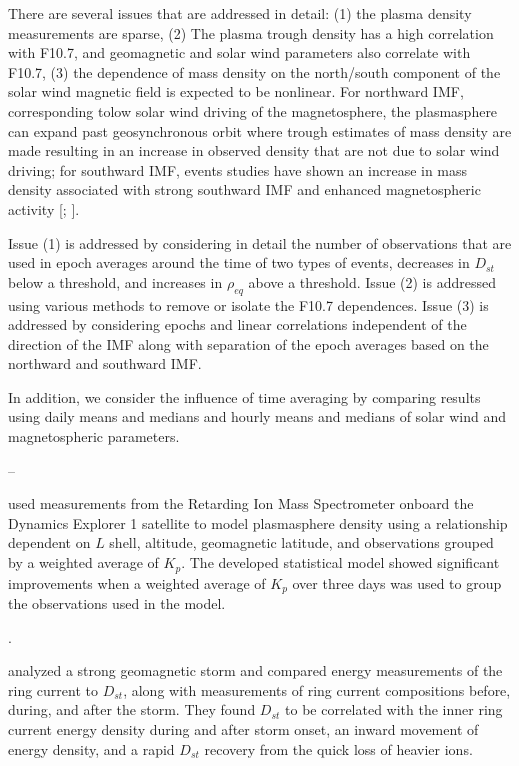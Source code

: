 \documentclass[10pt,twocolumn]{article}
\def\note#1\par{\textcolor{blue}{\textbf{#1}}\\}
\begin{document}
There are several issues that are addressed in detail: (1) the plasma density measurements are sparse, (2) The plasma trough density has a high correlation with F10.7, and geomagnetic and solar wind parameters also correlate with F10.7, (3) the dependence of mass density on the north/south component of the solar wind magnetic field is expected to be nonlinear. For northward IMF, corresponding tolow solar wind driving of the magnetosphere, the plasmasphere can expand past geosynchronous orbit where trough estimates of mass density are made resulting in an increase in observed density that are not due to solar wind driving; for southward IMF, events studies have shown an increase in mass density associated with strong southward IMF and enhanced magnetospheric activity [\cite{Takahashi2010}; \cite{Yao2008}].

Issue (1) is addressed by considering in detail the number of observations that are used in epoch averages around the time of two types of events, decreases in $D_{st}$ below a threshold, and increases in $\rho_{eq}$ above a threshold.  Issue (2) is addressed using various methods to remove or isolate the F10.7 dependences.  Issue (3) is addressed by considering epochs and linear correlations independent of the direction of the IMF along with separation of the epoch averages based on the northward and southward IMF.

In addition, we consider the influence of time averaging by comparing results using daily means and medians and hourly means and medians of solar wind and magnetospheric parameters.

--


\cite{Gallagher1988EmpiricalModelPlasmasphere} used measurements from the Retarding Ion Mass Spectrometer onboard the Dynamics Explorer 1 satellite to model plasmasphere density using a relationship dependent on $L$ shell, altitude, geomagnetic latitude, and observations grouped by a weighted average of $K_p$.  The developed statistical model showed significant improvements when a weighted average of $K_p$ over three days was used to group the observations used in the model.  \note{Discuss plasma trough relevance}.

\cite{Hamilton1988RingCurrentDevelopment} analyzed a strong geomagnetic storm and compared energy measurements of the ring current to $D_{st}$, along with measurements of ring current compositions before, during, and after the storm. They found $D_{st}$ to be correlated with the inner ring current energy density during and after storm onset, an inward movement of energy density, and a rapid $D_{st}$ recovery from the quick loss of heavier ions.
\end{document}
